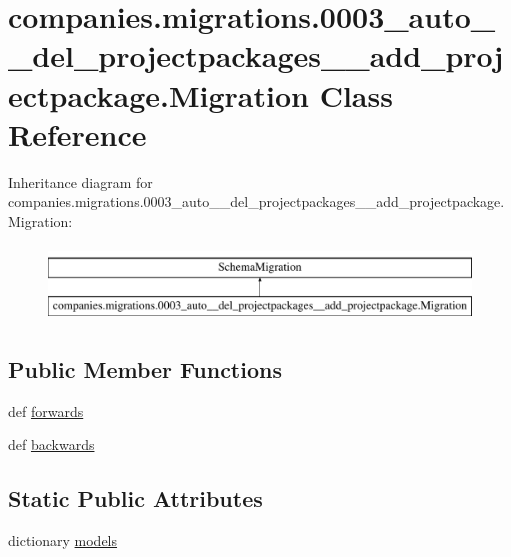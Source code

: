 \hypertarget{classcompanies_1_1migrations_1_10003__auto____del__projectpackages____add__projectpackage_1_1_migration}{\section{companies.\-migrations.0003\-\_\-auto\-\_\-\-\_\-del\-\_\-projectpackages\-\_\-\-\_\-add\-\_\-projectpackage.Migration Class Reference}
\label{classcompanies_1_1migrations_1_10003__auto____del__projectpackages____add__projectpackage_1_1_migration}
}
Inheritance diagram for companies.\-migrations.0003\-\_\-auto\-\_\-\-\_\-del\-\_\-projectpackages\-\_\-\-\_\-add\-\_\-projectpackage.Migration\-:\begin{figure}[H]
\begin{center}
\leavevmode
\includegraphics[height=2.000000cm]{classcompanies_1_1migrations_1_10003__auto____del__projectpackages____add__projectpackage_1_1_migration}
\end{center}
\end{figure}
\subsection*{Public Member Functions}
\begin{DoxyCompactItemize}
\item 
def \hyperlink{classcompanies_1_1migrations_1_10003__auto____del__projectpackages____add__projectpackage_1_1_migration_ad4e57d106871ff302f7cc8f8ebbafdec}{forwards}
\item 
def \hyperlink{classcompanies_1_1migrations_1_10003__auto____del__projectpackages____add__projectpackage_1_1_migration_a28a1c7ec314286911217e69465d13be6}{backwards}
\end{DoxyCompactItemize}
\subsection*{Static Public Attributes}
\begin{DoxyCompactItemize}
\item 
dictionary \hyperlink{classcompanies_1_1migrations_1_10003__auto____del__projectpackages____add__projectpackage_1_1_migration_ad1d25fef729cf8c6e216d5831fb257b7}{models}
\end{DoxyCompactItemize}


